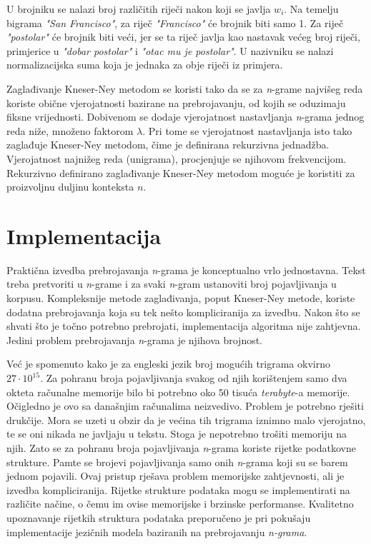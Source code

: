 \documentclass[times, utf8, diplomski, numeric]{fer}
\begin{document}
U brojniku se nalazi broj različitih riječi nakon koji se javlja $w_i$. Na temelju bigrama \textit{"San Francisco"}, za riječ \textit{"Francisco"} će brojnik biti samo 1. Za riječ \textit{"postolar"} će brojnik biti veći, jer se ta riječ javlja kao nastavak većeg broj riječi, primjerice u \textit{"dobar postolar"} i \textit{"otac mu je postolar"}. U nazivniku se nalazi normalizacijska suma koja je jednaka za obje riječi iz primjera.

Zaglađivanje Kneser-Ney metodom se koristi tako da se za \textit{n}-grame najvišeg reda koriste obične vjerojatnosti bazirane na prebrojavanju, od kojih se oduzimaju fiksne vrijednosti. Dobivenom se dodaje vjerojatnost nastavljanja \textit{n}-grama jednog reda niže, množeno faktorom $\lambda$. Pri tome se vjerojatnost nastavljanja isto tako zaglađuje Kneser-Ney metodom, čime je definirana rekurzivna jednadžba. Vjerojatnost najnižeg reda (unigrama), procjenjuje se njihovom frekvencijom. Rekurzivno definirano zaglađivanje Kneser-Ney metodom moguće je koristiti za proizvoljnu duljinu konteksta $n$.

\section{Implementacija}

Praktična izvedba prebrojavanja \textit{n}-grama je konceptualno vrlo jednostavna. Tekst treba pretvoriti u \textit{n}-grame i za svaki \textit{n}-gram ustanoviti broj pojavljivanja u korpusu. Kompleksnije metode zaglađivanja, poput Kneser-Ney metode, koriste dodatna prebrojavanja koja su tek nešto kompliciranija za izvedbu. Nakon što se shvati što je točno potrebno prebrojati, implementacija algoritma nije zahtjevna. Jedini problem prebrojavanja \textit{n}-grama je njihova brojnost.

Već je spomenuto kako je za engleski jezik broj mogućih trigrama okvirno $27 \cdot 10^{15}$. Za pohranu broja pojavljivanja svakog od njih korištenjem samo dva okteta računalne memorije bilo bi potrebno oko 50 tisuća \textit{terabyte}-a memorije. Očigledno je ovo sa današnjim računalima neizvedivo. Problem je potrebno rješiti drukčije. Mora se uzeti u obzir da je većina tih trigrama iznimno malo vjerojatno, te se oni nikada ne javljaju u tekstu. Stoga je nepotrebno trošiti memoriju na njih. Zato se za pohranu broja pojavljivanja \textit{n}-grama koriste rijetke  podatkovne strukture. Pamte se brojevi pojavljivanja samo onih \textit{n}-grama koji su se barem jednom pojavili. Ovaj pristup rješava problem memorijske zahtjevnosti, ali je izvedba kompliciranija. Rijetke strukture podataka mogu se implementirati na različite načine, o čemu im ovise memorijske i brzinske performanse. Kvalitetno upoznavanje rijetkih struktura podataka preporučeno je pri pokušaju implementacije jezičnih modela baziranih na prebrojavanju \textit{n-grama}.
\end{document}
